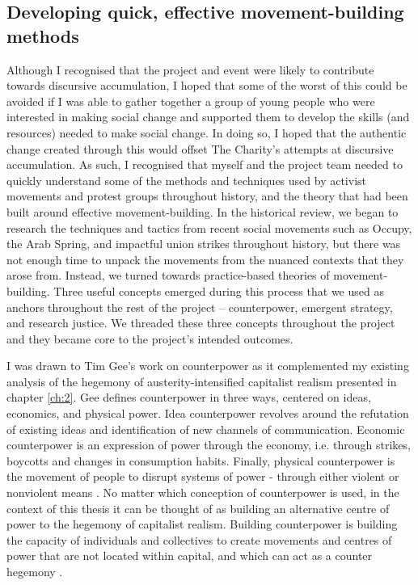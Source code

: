 \subsection{Developing quick, effective movement-building methods}
Although I recognised that the project and event were likely to contribute towards discursive accumulation, I hoped that some of the worst of this could be avoided if I was able to gather together a group of young people who were interested in making social change and supported them to develop the skills (and resources) needed to make social change. In doing so, I hoped that the authentic change created through this would offset The Charity's attempts at discursive accumulation. As such, I recognised that myself and the project team needed to quickly understand some of the methods and techniques used by activist movements and protest groups throughout history, and the theory that had been built around effective movement-building. In the historical review, we began to research the techniques and tactics from recent social movements such as Occupy, the Arab Spring, and impactful union strikes throughout history, but there was not enough time to unpack the movements from the nuanced contexts that they arose from. Instead, we turned towards practice-based theories of movement-building. Three useful concepts emerged during this process that we used as anchors throughout the rest of the project – counterpower, emergent strategy, and research justice. We threaded these three concepts throughout the project and they became core to the project's intended outcomes. 

I was drawn to Tim Gee’s work on counterpower \citep{gee_counterpower:_2011} as it complemented my existing analysis of the hegemony of austerity-intensified capitalist realism presented in chapter \ref{ch:2}.  Gee defines counterpower in three ways, centered on ideas, economics, and physical power. Idea counterpower revolves around the refutation of existing ideas and identification of new channels of communication. Economic counterpower is an expression of power through the economy, i.e. through strikes, boycotts and changes in consumption habits. Finally, physical counterpower is the movement of people to disrupt systems of power - through either violent or nonviolent means \citep[p. 13]{gee_counterpower:_2011}. No matter which conception of counterpower is used, in the context of this thesis it can be thought of as building an alternative centre of power to the hegemony of capitalist realism. Building counterpower is building the capacity of individuals and collectives to create movements and centres of power that are not located within capital, and which can act as a counter hegemony \citep[p. 19]{gee_counterpower:_2011}. 

